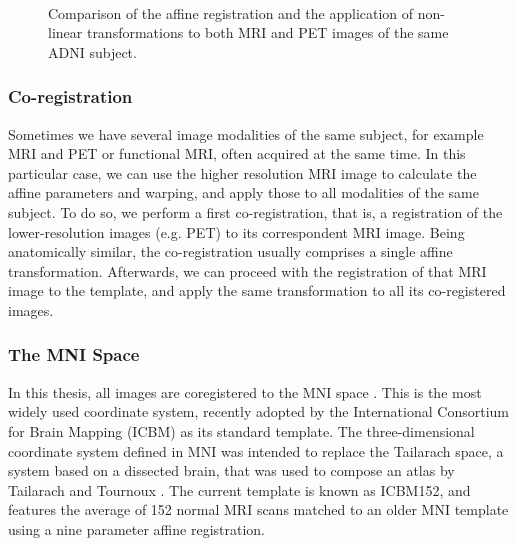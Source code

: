 \begin{figure}[bth]
	\myfloatalign
	 \\
	\caption[Comparison of the affine registration and the application of non-linear transformations to the images]{Comparison of the affine registration and the application of non-linear transformations to both \ac{MRI} and \ac{PET} images of the same \ac{ADNI} subject.}\label{fig:diffeomorphisms}
\end{figure}


\subsubsection{Co-registration}
Sometimes we have several image modalities of the same subject, for example \ac{MRI} and \ac{PET} or functional \ac{MRI}, often acquired at the same time. In this particular case, we can use the higher resolution \ac{MRI} image to calculate the affine parameters and warping, and apply those to all modalities of the same subject. To do so, we perform a first co-registration, that is, a registration of the lower-resolution images (e.g. \ac{PET}) to its correspondent \ac{MRI} image. Being anatomically similar, the co-registration usually comprises a single affine transformation. Afterwards, we can proceed with the registration of that \ac{MRI} image to the template, and apply the same transformation to all its co-registered images. 

\subsubsection{The MNI Space}
In this thesis, all images are coregistered to the \acf{MNI} space \cite{Mazziotta2001}. This is the most widely used coordinate system, recently adopted by the International Consortium for Brain Mapping (ICBM) as its standard template. The three-dimensional coordinate system defined in \ac{MNI} was intended to replace the Tailarach space, a system based on a dissected brain, that was used to compose an atlas by Tailarach and Tournoux \cite{Talairach1988c}. The current template is known as ICBM152, and features the average of 152 normal \ac{MRI} scans matched to an older \ac{MNI} template using a nine parameter affine registration. 

